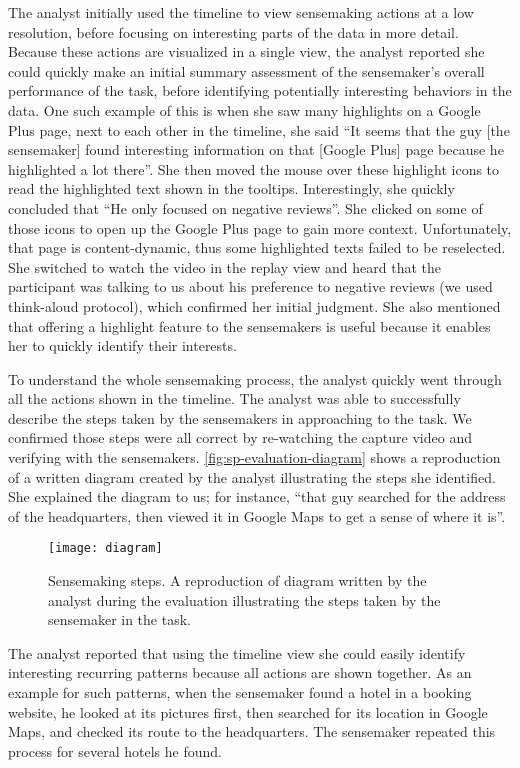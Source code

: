 The analyst initially used the timeline to view sensemaking actions at a low resolution, before focusing on interesting parts of the data in more detail. Because these actions are visualized in a single view, the analyst reported she could quickly make an initial summary assessment of the sensemaker's overall performance of the task, before identifying potentially interesting behaviors in the data. One such example of this is when she saw many highlights on a Google Plus page, next to each other in the timeline, she said ``It seems that the guy [the sensemaker] found interesting information on that [Google Plus] page because he highlighted a lot there''. She then moved the mouse over these highlight icons to read the highlighted text shown in the tooltips. Interestingly, she quickly concluded that ``He only focused on negative reviews''. She clicked on some of those icons to open up the Google Plus page to gain more context. Unfortunately, that page is content-dynamic, thus some highlighted texts failed to be reselected. She switched to watch the video in the replay view and heard that the participant was talking to us about his preference to negative reviews (we used think-aloud protocol), which confirmed her initial judgment. She also mentioned that offering a highlight feature to the sensemakers is useful because it enables her to quickly identify their interests.

To understand the whole sensemaking process, the analyst quickly went through all the actions shown in the timeline. The analyst was able to successfully describe the steps taken by the sensemakers in approaching to the task. We confirmed those steps were all correct by re-watching the capture video and verifying with the sensemakers. \autoref{fig:sp-evaluation-diagram} shows a reproduction of a written diagram created by the analyst illustrating the steps she identified. She explained the diagram to us; for instance, ``that guy searched for the address of the headquarters, then viewed it in Google Maps to get a sense of where it is''.

\begin{figure}[ht]
\centering
\texttt{[image: diagram]}
\caption[Sensemaking steps]{Sensemaking steps. A reproduction of diagram written by the analyst during the evaluation illustrating the steps taken by the sensemaker in the task.}
\label{fig:sp-evaluation-diagram}
\end{figure}

The analyst reported that using the timeline view she could easily identify interesting recurring patterns because all actions are shown together. As an example for such patterns, when the sensemaker found a hotel in a booking website, he looked at its pictures first, then searched for its location in Google Maps, and checked its route to the headquarters. The sensemaker repeated this process for several hotels he found.

